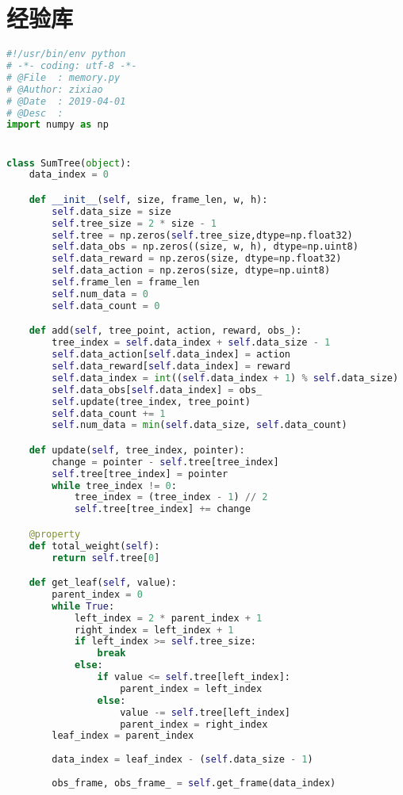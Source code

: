 \section{经验库}
\begin{lstlisting}[language={python}]
#!/usr/bin/env python
# -*- coding: utf-8 -*-
# @File  : memory.py
# @Author: zixiao
# @Date  : 2019-04-01
# @Desc  :
import numpy as np


class SumTree(object):
    data_index = 0

    def __init__(self, size, frame_len, w, h):
        self.data_size = size
        self.tree_size = 2 * size - 1
        self.tree = np.zeros(self.tree_size,dtype=np.float32)
        self.data_obs = np.zeros((size, w, h), dtype=np.uint8)
        self.data_reward = np.zeros(size, dtype=np.float32)
        self.data_action = np.zeros(size, dtype=np.uint8)
        self.frame_len = frame_len
        self.num_data = 0
        self.data_count = 0

    def add(self, tree_point, action, reward, obs_):
        tree_index = self.data_index + self.data_size - 1
        self.data_action[self.data_index] = action
        self.data_reward[self.data_index] = reward
        self.data_index = int((self.data_index + 1) % self.data_size)
        self.data_obs[self.data_index] = obs_
        self.update(tree_index, tree_point)
        self.data_count += 1
        self.num_data = min(self.data_size, self.data_count)

    def update(self, tree_index, pointer):
        change = pointer - self.tree[tree_index]
        self.tree[tree_index] = pointer
        while tree_index != 0:
            tree_index = (tree_index - 1) // 2
            self.tree[tree_index] += change

    @property
    def total_weight(self):
        return self.tree[0]

    def get_leaf(self, value):
        parent_index = 0
        while True:
            left_index = 2 * parent_index + 1
            right_index = left_index + 1
            if left_index >= self.tree_size:
                break
            else:
                if value <= self.tree[left_index]:
                    parent_index = left_index
                else:
                    value -= self.tree[left_index]
                    parent_index = right_index
        leaf_index = parent_index
        
        data_index = leaf_index - (self.data_size - 1)
        
        obs_frame, obs_frame_ = self.get_frame(data_index)


\end{lstlisting}
